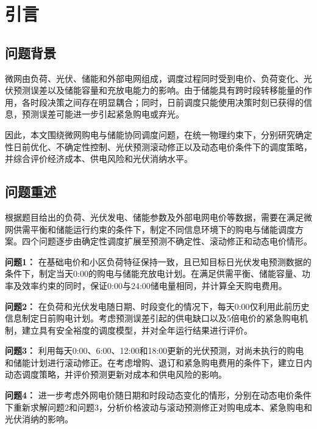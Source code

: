 \documentclass{cumcmthesis}
\begin{document}
\section{引言}

\subsection{问题背景}

微网由负荷、光伏、储能和外部电网组成，调度过程同时受到电价、负荷变化、光伏预测误差以及储能容量和充放电能力的影响。由于储能具有跨时段转移能量的作用，各时段决策之间存在明显耦合；同时，日前调度只能使用决策时刻已获得的信息，预测误差可能进一步引起紧急购电或弃光。

因此，本文围绕微网购电与储能协同调度问题，在统一物理约束下，分别研究确定性日前优化、不确定性控制、光伏预测滚动修正以及动态电价条件下的调度策略，并综合评价经济成本、供电风险和光伏消纳水平\cite{olivares2014}。

\subsection{问题重述}

根据题目给出的负荷、光伏发电、储能参数及外部电网电价等数据，需要在满足微网供需平衡和储能运行约束的条件下，制定不同信息环境下的购电与储能调度方案。四个问题逐步由确定性调度扩展至预测不确定性、滚动修正和动态电价情形。

\noindent\textbf{问题1：}
在基础电价和小区负荷特征保持一致，且已知目标日光伏发电预测数据的条件下，制定当天0:00的购电与储能充放电计划。在满足供需平衡、储能容量、功率及效率约束的同时，保证0:00与24:00储电量相同，并计算全天购电费用。

\medskip

\noindent\textbf{问题2：}
在负荷和光伏发电随日期、时段变化的情况下，每天0:00仅利用此前历史信息制定日前购电计划。考虑预测误差引起的供电缺口以及5倍电价的紧急购电机制，建立具有安全裕度的调度模型，并对全年运行结果进行评价。

\medskip

\noindent\textbf{问题3：}
利用每天0:00、6:00、12:00和18:00更新的光伏预测，对尚未执行的购电和储能计划进行滚动修正。在考虑增购、退订和紧急购电费用的条件下，建立日内动态调度策略，并评价预测更新对成本和供电风险的影响。

\medskip

\noindent\textbf{问题4：}
进一步考虑外网电价随日期和时段动态变化的情形，分别在动态电价条件下重新求解问题2和问题3，分析价格波动与滚动预测修正对购电成本、紧急购电和光伏消纳的影响。
\end{document}
